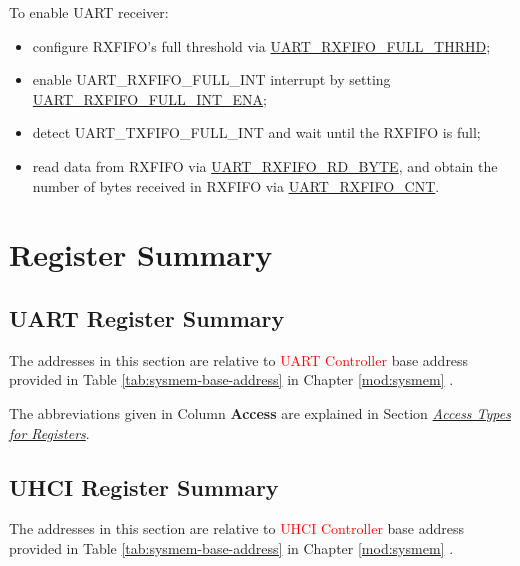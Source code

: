 \documentclass[main\_\_EN.tex]{subfiles}
\begin{document}
To enable UART receiver:
\begin{itemize}
    \item configure RXFIFO's full threshold via \hyperref[fielddesc:UARTRXFIFOFULLTHRHD]{UART\_RXFIFO\_FULL\_THRHD};
    \item enable UART\_RXFIFO\_FULL\_INT interrupt by setting \hyperref[fielddesc:UARTRXFIFOFULLINTENA]{UART\_RXFIFO\_FULL\_INT\_ENA};
    \item detect UART\_TXFIFO\_FULL\_INT and wait until the RXFIFO is full;
    \item read data from RXFIFO via  \hyperref[fielddesc:UARTRXFIFORDBYTE]{UART\_RXFIFO\_RD\_BYTE}, and obtain the number of bytes received in RXFIFO via \hyperref[fielddesc:UARTRXFIFOCNT]{UART\_RXFIFO\_CNT}.
\end{itemize}





\clearpage
\hypertarget{uart-reg-summ}{}
\section{Register Summary}
\label{sec:uart-reg-summ}


\subsection{UART Register Summary}

The addresses in this section are relative to \textcolor{red}{UART Controller} base address provided in Table \ref{tab:sysmem-base-address} in Chapter \ref{mod:sysmem} \textit{}.

The abbreviations given in Column \textbf{Access} are explained in Section \hyperref[glossary-access-types]{\textit{Access Types for Registers}}.



\subsection{UHCI Register Summary}

The addresses in this section are relative to \textcolor{red}{UHCI Controller} base address provided in Table \ref{tab:sysmem-base-address} in Chapter \ref{mod:sysmem} \textit{}.
\end{document}
